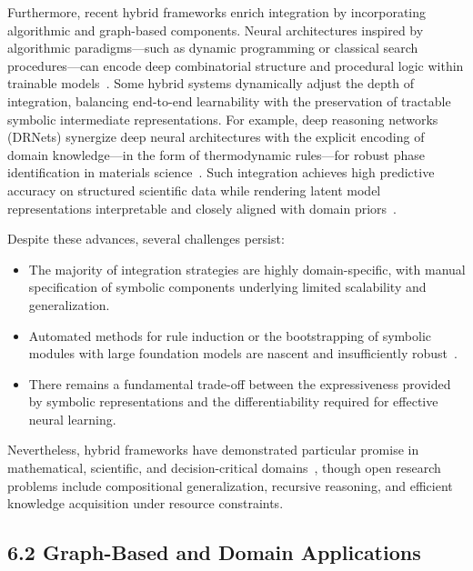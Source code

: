 \documentclass[11pt]{article}
\begin{document}
Furthermore, recent hybrid frameworks enrich integration by incorporating algorithmic and graph-based components. Neural architectures inspired by algorithmic paradigms—such as dynamic programming or classical search procedures—can encode deep combinatorial structure and procedural logic within trainable models~\cite{reference5,reference56}. Some hybrid systems dynamically adjust the depth of integration, balancing end-to-end learnability with the preservation of tractable symbolic intermediate representations. For example, deep reasoning networks (DRNets) synergize deep neural architectures with the explicit encoding of domain knowledge—in the form of thermodynamic rules—for robust phase identification in materials science~\cite{reference45}. Such integration achieves high predictive accuracy on structured scientific data while rendering latent model representations interpretable and closely aligned with domain priors~\cite{reference45,reference93}.

Despite these advances, several challenges persist:
\begin{itemize}
    \item The majority of integration strategies are highly domain-specific, with manual specification of symbolic components underlying limited scalability and generalization.
    \item Automated methods for rule induction or the bootstrapping of symbolic modules with large foundation models are nascent and insufficiently robust~\cite{reference1,reference22,reference45,reference49,reference54}.
    \item There remains a fundamental trade-off between the expressiveness provided by symbolic representations and the differentiability required for effective neural learning.
\end{itemize}
Nevertheless, hybrid frameworks have demonstrated particular promise in mathematical, scientific, and decision-critical domains~\cite{reference1,reference5,reference10,reference11,reference42,reference45,reference49,reference54,reference68,reference86}, though open research problems include compositional generalization, recursive reasoning, and efficient knowledge acquisition under resource constraints.

\subsection{6.2 Graph-Based and Domain Applications}
\end{document}
